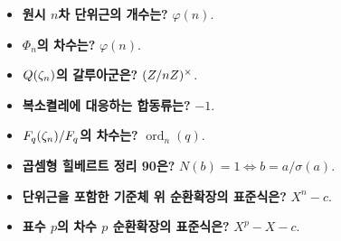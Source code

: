 \begin{itemize}
  \item \textbf{원시 $n$차 단위근의 개수는?} $\varphi(n)$.
  \item \textbf{$\Phi_n$의 차수는?} $\varphi(n)$.
  \item \textbf{$Q(\zeta_n)$의 갈루아군은?} $(Z/nZ)^\times$.
  \item \textbf{복소켤레에 대응하는 합동류는?} $-1$.
  \item \textbf{$F_q(\zeta_n)/F_q$의 차수는?} $\operatorname{ord}_n(q)$.
  \item \textbf{곱셈형 힐베르트 정리 90은?} $N(b)=1\iff b=a/\sigma(a)$.
  \item \textbf{단위근을 포함한 기준체 위 순환확장의 표준식은?} $X^n-c$.
  \item \textbf{표수 $p$의 차수 $p$ 순환확장의 표준식은?} $X^p-X-c$.
\end{itemize}

